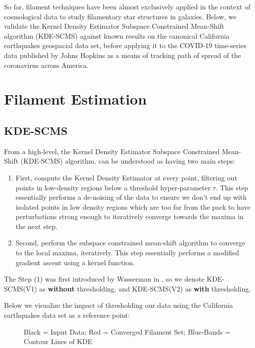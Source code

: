 \documentclass[letterpaper,reqno, 11pt]{amsart}
\theoremstyle{plain}
\theoremstyle{definition}
\newcommand{\1}{\mathds{1}}
\begin{document}
\quad So far, filament techniques have been almost exclusively applied in the context of cosmological data to study filamentary star structures in galaxies. Below, we validate the Kernel Density Estimator Subspace Constrained Mean-Shift algorithm (KDE-SCMS) against known results on the canonical California earthquakes geospacial data set, before applying it to the COVID-19 time-series data published by Johns Hopkins as a means of tracking path of spread of the coronavirus across America.

\setcounter{section}{0}
\section{Filament Estimation}
\subsection{KDE-SCMS}
From a high-level, the Kernel Density Estimator Subspace Constrained Mean-Shift (KDE-SCMS) algorithm, can be understood as having two main steps:

\begin{enumerate}
    \item First, compute the Kernel Density Estimator at every point, filtering out points in low-density regions below a threshold hyper-parameter $\tau$. This step essentially performs a de-noising of the data to ensure we don't end up with isolated points in low density regions which are too far from the pack to have perturbations strong enough to iteratively converge towards the maxima in the next step.
    \item Second, perform the subspace constrained mean-shift algorithm to converge to the local maxima, iteratively. This step essentially performs a modified gradient ascent using a kernel function.
\end{enumerate}

\mbox{}

The Step (1) was first introduced by Wasserman in \cite{SuRF}, so we denote KDE-SCMS(V1) as \textbf{without} thresholding, and KDE-SCMS(V2) as \textbf{with} thresholding. 

Below we visualize the impact of thresholding our data using the California earthquakes data set as a reference point:

\begin{figure}[hbt]
    \centering
    \qquad
    \caption{\smaller Black = Input Data; Red = Converged Filament Set; Blue-Bands = Contour Lines of KDE}%
    \label{fig:thresholding}%
\end{figure}
\end{document}
